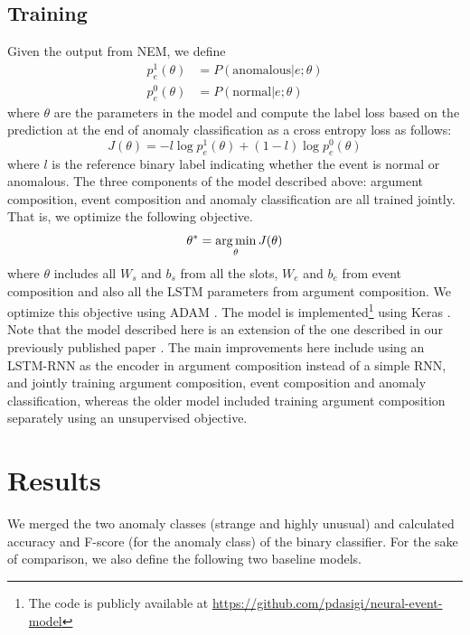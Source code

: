 \subsection{Training}
Given the output from NEM, we define
\begin{align}
 p^1_e(\theta) &= P(\text{anomalous} | e; \theta) \\
 p^0_e(\theta) &= P(\text{normal} | e; \theta)
\end{align}
where $\theta$ are the parameters in the model and compute the label loss based on the prediction at the end of anomaly classification as a cross entropy loss as follows:
\begin{equation}
J(\theta) = - l \log p^1_e(\theta) + (1-l) \log p^0_e(\theta)
\end{equation}
where $l$ is the reference binary label indicating whether the event is normal or
anomalous. The three components of the model described above: argument composition, event composition and anomaly classification are all trained jointly.
That is, we optimize the following objective.
\begin{equation}
 \theta^* = \operatorname*{arg\,min}_{\theta} J(\theta)
\end{equation}
where $\theta$ includes all $W_s$ and $b_s$ from all the slots, $W_e$ and $b_e$ from event composition and also all the LSTM parameters from argument composition.
We optimize this objective using ADAM \citep{kingma2014adam}. The model is implemented\footnote{The code is publicly available at \url{https://github.com/pdasigi/neural-event-model}}
using Keras \citep{chollet2015keras}. Note that the model described here is an extension of the one described in our previously published paper \citep{dasigi2014modeling}.
The main improvements here include using an LSTM-RNN as the encoder in argument composition instead of a simple RNN, and jointly training argument composition, event composition and anomaly classification,
whereas the older model included training argument composition separately using an unsupervised objective.

\section{Results}
We merged the two anomaly classes (strange and highly unusual) and calculated accuracy and F-score (for the anomaly class) of the binary
classifier. For the sake of comparison, we also define the following two baseline models.

